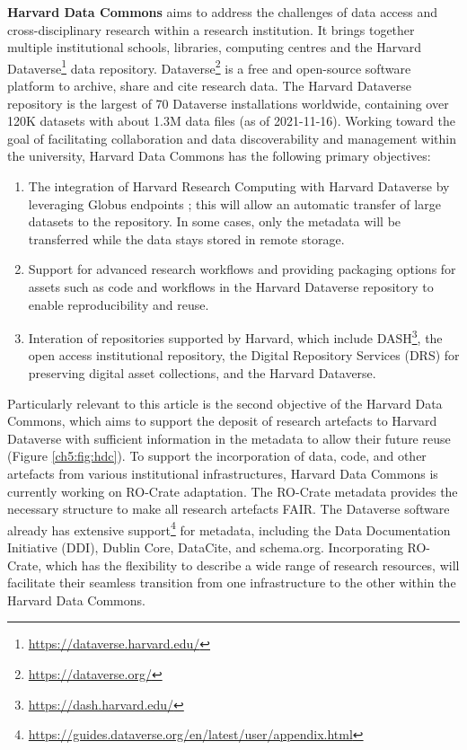 \textbf{Harvard Data Commons}
\cite{Crosas 2020} aims to address the
challenges of data access and cross-disciplinary research within a
research institution. It brings together multiple institutional schools,
libraries, computing centres and the
Harvard
Dataverse\footnote{\url{https://dataverse.harvard.edu/}} data repository.
Dataverse\footnote{\url{https://dataverse.org/}}
\cite{Crosas 2011} is a free
and open-source software platform to archive, share and cite research
data. The Harvard Dataverse repository is the largest of 70 Dataverse
installations worldwide, containing over 120K datasets with about 1.3M
data files (as of 2021-11-16). Working toward the goal of facilitating
collaboration and data discoverability and management within the
university, Harvard Data Commons has the following primary objectives:

\begin{enumerate}
\item
  The integration of Harvard Research Computing with Harvard Dataverse
  by leveraging Globus endpoints
  \cite{Chard 2014}; this will allow
  an automatic transfer of large datasets to the repository. In some
  cases, only the metadata will be transferred while the data stays
  stored in remote storage.
\item
  Support for advanced research workflows and providing packaging
  options for assets such as code and workflows in the Harvard Dataverse
  repository to enable reproducibility and reuse.
\item
  Interation of repositories supported by Harvard, which include
  DASH\footnote{\url{https://dash.harvard.edu/}}, the open access institutional
  repository, the Digital Repository Services (DRS) for preserving
  digital asset collections, and the Harvard Dataverse.
\end{enumerate}

Particularly relevant to this article is the second objective of the
Harvard Data Commons, which aims to support the deposit of research
artefacts to Harvard Dataverse with sufficient information in the
metadata to allow their future reuse (Figure \vref{ch5:fig:hdc}). To support the incorporation of data, code, and other artefacts
from various institutional infrastructures, Harvard Data Commons is
currently working on RO-Crate adaptation. The RO-Crate metadata provides
the necessary structure to make all research artefacts FAIR. The
Dataverse software already has
extensive
support\footnote{\url{https://guides.dataverse.org/en/latest/user/appendix.html}} for metadata, including the Data Documentation Initiative
(DDI), Dublin Core, DataCite, and schema.org. Incorporating RO-Crate,
which has the flexibility to describe a wide range of research
resources, will facilitate their seamless transition from one
infrastructure to the other within the Harvard Data Commons.

